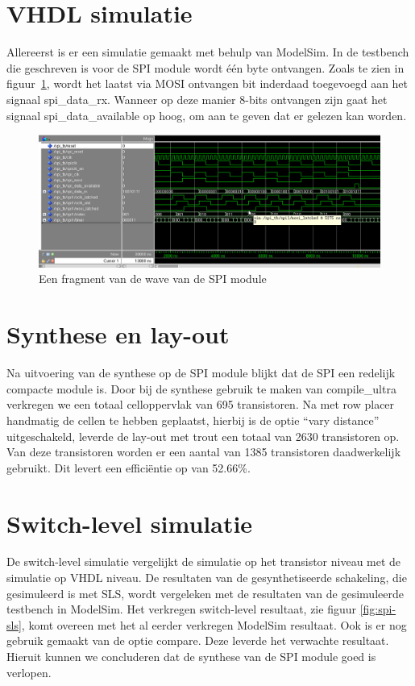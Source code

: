 \documentclass{scrartcl} %
\begin{document}
\section{VHDL simulatie}
Allereerst is er een simulatie gemaakt met behulp van ModelSim. In de testbench die geschreven is voor de SPI module wordt één byte ontvangen. Zoals te zien in figuur~\ref{fig:spi-modelsim}, wordt het laatst via MOSI ontvangen bit inderdaad toegevoegd aan het signaal spi\_data\_rx. Wanneer op deze manier 8-bits ontvangen zijn gaat het signaal spi\_data\_available op hoog, om aan te geven dat er gelezen kan worden.

\begin{figure}[H]
	\centering
	\includegraphics[width=\textwidth]{resource/waveSPI2.png}
	\caption{Een fragment van de wave van de SPI module}
	\label{fig:spi-modelsim}
\end{figure}

\section{Synthese en lay-out}
\label{sec:spi-synth} 
Na uitvoering van de synthese op de SPI module blijkt dat de SPI een redelijk compacte module is. Door bij de synthese gebruik te maken van compile\_ultra verkregen we een totaal celloppervlak van 695 transistoren. Na met row placer handmatig de cellen te hebben geplaatst, hierbij is de optie ``vary distance'' uitgeschakeld, leverde de lay-out met trout een totaal van 2630 transistoren op. Van deze transistoren worden er een aantal van 1385 transistoren daadwerkelijk gebruikt. Dit levert een efficiëntie op van 52.66\%.

\section{Switch-level simulatie}
De switch-level simulatie vergelijkt de simulatie op het transistor niveau met de simulatie op VHDL niveau. De resultaten van de gesynthetiseerde schakeling, die gesimuleerd is met SLS, wordt vergeleken met de resultaten van de gesimuleerde testbench in ModelSim. Het verkregen switch-level resultaat, zie figuur \ref{fig:spi-sls}, komt overeen met het al eerder verkregen ModelSim resultaat. Ook is er nog gebruik gemaakt van de optie compare. Deze leverde het verwachte resultaat. Hieruit kunnen we concluderen dat de synthese van de SPI module goed is verlopen. 
\end{document}
